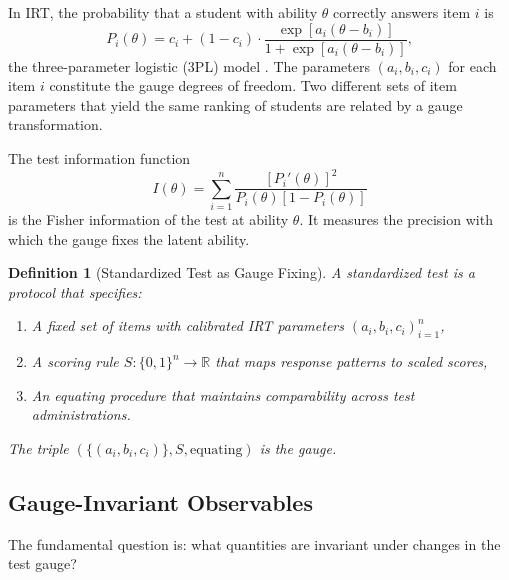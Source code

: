 \documentclass[12pt,a4paper]{article}
\newtheorem{definition}[theorem]{Definition}
\theoremstyle{remark}
\newcommand{\R}{\mathbb{R}}
\begin{document}
In IRT, the probability that a student with ability $\theta$ correctly answers item $i$ is
\begin{equation}
P_i(\theta) = c_i + (1 - c_i) \cdot \frac{\exp[a_i(\theta - b_i)]}{1 + \exp[a_i(\theta - b_i)]},
\label{eq:irt3pl}
\end{equation}
the three-parameter logistic (3PL) model \cite{lord1968}. The parameters $(a_i, b_i, c_i)$ for each item $i$ constitute the gauge degrees of freedom. Two different sets of item parameters that yield the same ranking of students are related by a gauge transformation.

The test information function \cite{birnbaum1968}
\begin{equation}
I(\theta) = \sum_{i=1}^{n} \frac{[P_i'(\theta)]^2}{P_i(\theta)[1 - P_i(\theta)]}
\label{eq:test_info}
\end{equation}
is the Fisher information of the test at ability $\theta$. It measures the precision with which the gauge fixes the latent ability.

\begin{definition}[Standardized Test as Gauge Fixing]
A standardized test is a protocol that specifies:
\begin{enumerate}
    \item A fixed set of items with calibrated IRT parameters $(a_i, b_i, c_i)_{i=1}^n$,
    \item A scoring rule $S: \{0,1\}^n \to \R$ that maps response patterns to scaled scores,
    \item An equating procedure that maintains comparability across test administrations.
\end{enumerate}
The triple $(\{(a_i,b_i,c_i)\}, S, \text{equating})$ is the gauge.
\end{definition}

\subsection{Gauge-Invariant Observables}

The fundamental question is: what quantities are invariant under changes in the test gauge?
\end{document}
